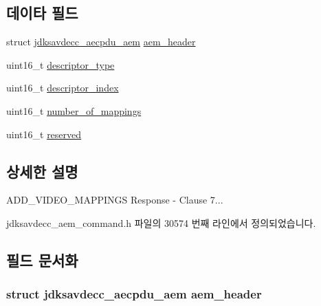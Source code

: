 \subsection*{데이타 필드}
\begin{DoxyCompactItemize}
\item 
struct \hyperlink{structjdksavdecc__aecpdu__aem}{jdksavdecc\+\_\+aecpdu\+\_\+aem} \hyperlink{structjdksavdecc__aem__command__add__video__mappings__response_ae1e77ccb75ff5021ad923221eab38294}{aem\+\_\+header}
\item 
uint16\+\_\+t \hyperlink{structjdksavdecc__aem__command__add__video__mappings__response_ab7c32b6c7131c13d4ea3b7ee2f09b78d}{descriptor\+\_\+type}
\item 
uint16\+\_\+t \hyperlink{structjdksavdecc__aem__command__add__video__mappings__response_a042bbc76d835b82d27c1932431ee38d4}{descriptor\+\_\+index}
\item 
uint16\+\_\+t \hyperlink{structjdksavdecc__aem__command__add__video__mappings__response_ac7db472c5622ef473d5d0a5c416d5531}{number\+\_\+of\+\_\+mappings}
\item 
uint16\+\_\+t \hyperlink{structjdksavdecc__aem__command__add__video__mappings__response_a5a6ed8c04a3db86066924b1a1bf4dad3}{reserved}
\end{DoxyCompactItemize}


\subsection{상세한 설명}
A\+D\+D\+\_\+\+V\+I\+D\+E\+O\+\_\+\+M\+A\+P\+P\+I\+N\+GS Response -\/ Clause 7... 

jdksavdecc\+\_\+aem\+\_\+command.\+h 파일의 30574 번째 라인에서 정의되었습니다.



\subsection{필드 문서화}
\subsubsection[{\texorpdfstring{aem\+\_\+header}{aem_header}}]{\setlength{\rightskip}{0pt plus 5cm}struct {\bf jdksavdecc\+\_\+aecpdu\+\_\+aem} aem\+\_\+header}\hypertarget{structjdksavdecc__aem__command__add__video__mappings__response_ae1e77ccb75ff5021ad923221eab38294}{}\label{structjdksavdecc__aem__command__add__video__mappings__response_ae1e77ccb75ff5021ad923221eab38294}


